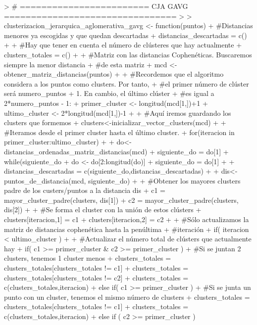 \documentclass[parskip=full]{scrartcl}
\begin{document}
\begin{Schunk}
\begin{Sinput}
> # ======================== CJA GAVG ================================
> 
> clusterizacion_jerarquica_aglomerativa_gavg <- function(puntos) {
+   #Distancias menores ya escogidas y que quedan descartadas
+   distancias_descartadas = c()
+   
+   #Hay que tener en cuenta el número de clústeres que hay actualmente
+   clusters_totales = c()
+   
+   #Matriz con las distancias Cophenéticas. Buscaremos siempre la menor distancia
+   #de esta matriz
+   mcd <- obtener_matriz_distancias(puntos)
+   
+   #Recordemos que el algoritmo considera a los puntos como clusters. Por tanto, 
+   #el primer número de clúster será numero_puntos + 1. En cambio, el último clúster
+   #es igual a 2*numero_puntos - 1:
+   primer_cluster <- longitud(mcd[1,])+1
+   ultimo_cluster <- 2*longitud(mcd[1,])-1
+   
+   #Aquí iremos guardando los clusters que formemos
+   clusters<-inicializar_vector_clusters(mcd)
+   
+   #Iteramos desde el primer cluster hasta el último cluster.
+   for(iteracion in primer_cluster:ultimo_cluster){
+     
+     do<-distancias_ordenadas_matriz_distancias(mcd)
+     siguiente_do = do[1]
+     while(siguiente_do %
+       do <- do[2:longitud(do)]
+       siguiente_do = do[1]
+     }
+     distancias_descartadas = c(siguiente_do,distancias_descartadas)
+     
+     dis<-puntos_de_distancia(mcd, siguiente_do)
+     
+     #Obtener los mayores clusters padre de los custers/puntos a la distancia dis
+     c1 = mayor_cluster_padre(clusters, dis[1])
+     c2 = mayor_cluster_padre(clusters, dis[2])
+   
+     #Se forma el cluster con la unión de estos clústers  
+     clusters[iteracion,1] = c1
+     clusters[iteracion,2] = c2
+ 
+     #Sólo actualizamos la matriz de distancias cophenética hasta la penúltima
+     #iteración
+     if( iteracion < ultimo_cluster ){
+       
+       #Actualizar el número total de clústers que actualmente hay
+       if( c1 >= primer_cluster & c2 >= primer_cluster ) {
+         #Si se juntan 2 clusters, tenemos 1 cluster menos
+         clusters_totales = clusters_totales[clusters_totales != c1]
+         clusters_totales = clusters_totales[clusters_totales != c2]
+         clusters_totales = c(clusters_totales,iteracion)
+       } else if( c1 >= primer_cluster ) {
+         #Si se junta un punto con un cluster, tenemos el mismo número de clusters
+         clusters_totales = clusters_totales[clusters_totales != c1]
+         clusters_totales = c(clusters_totales,iteracion)
+       } else if ( c2 >= primer_cluster ) {
}}}
\end{Sinput}
\end{Schunk}
\end{document}
